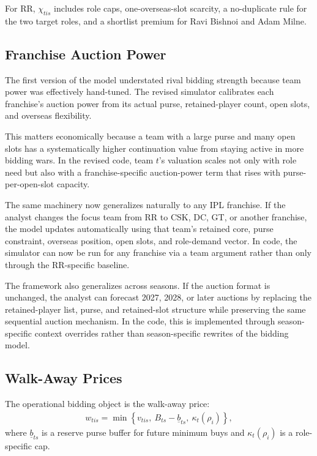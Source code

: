 \documentclass[11pt]{article}
\begin{document}
For RR, \(\chi_{tis}\) includes role caps, one-overseas-slot scarcity, a no-duplicate rule for the two target roles, and a shortlist premium for Ravi Bishnoi and Adam Milne.

\subsection{Franchise Auction Power}

The first version of the model understated rival bidding strength because team power was effectively hand-tuned. The revised simulator calibrates each franchise's auction power from its actual purse, retained-player count, open slots, and overseas flexibility.



This matters economically because a team with a large purse and many open slots has a systematically higher continuation value from staying active in more bidding wars. In the revised code, team \(t\)'s valuation scales not only with role need but also with a franchise-specific auction-power term that rises with purse-per-open-slot capacity.

The same machinery now generalizes naturally to any IPL franchise. If the analyst changes the focus team from RR to CSK, DC, GT, or another franchise, the model updates automatically using that team's retained core, purse constraint, overseas position, open slots, and role-demand vector. In code, the simulator can now be run for any franchise via a team argument rather than only through the RR-specific baseline.

The framework also generalizes across seasons. If the auction format is unchanged, the analyst can forecast 2027, 2028, or later auctions by replacing the retained-player list, purse, and retained-slot structure while preserving the same sequential auction mechanism. In the code, this is implemented through season-specific context overrides rather than season-specific rewrites of the bidding model.

\subsection{Walk-Away Prices}

The operational bidding object is the walk-away price:
\begin{align}
w_{tis}=\min\left\{v_{tis},\ B_{ts}-\underline{b}_{ts},\ \kappa_t(\rho_i)\right\},
\end{align}
where \(\underline{b}_{ts}\) is a reserve purse buffer for future minimum buys and \(\kappa_t(\rho_i)\) is a role-specific cap.
\end{document}
